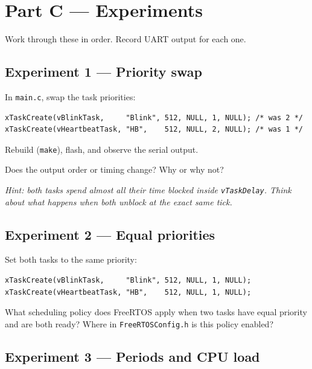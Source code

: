 \documentclass[11pt, a4paper]{article}
\newcommand{\file}[1]{\texttt{\small #1}}
\newcommand{\api}[1]{\texttt{\small #1}}
\begin{document}
\section{Part C --- Experiments}

Work through these in order.  Record UART output for each one.

\subsection{Experiment 1 --- Priority swap}

In \file{main.c}, swap the task priorities:

\begin{lstlisting}[style=cstyle]
xTaskCreate(vBlinkTask,     "Blink", 512, NULL, 1, NULL); /* was 2 */
xTaskCreate(vHeartbeatTask, "HB",    512, NULL, 2, NULL); /* was 1 */
\end{lstlisting}

Rebuild (\texttt{make}), flash, and observe the serial output.

\begin{questionbox}
  Does the output order or timing change?  Why or why not?

  \textit{Hint: both tasks spend almost all their time blocked inside
  \api{vTaskDelay}.  Think about what happens when both unblock at the exact same tick.}
\end{questionbox}

\subsection{Experiment 2 --- Equal priorities}

Set both tasks to the same priority:

\begin{lstlisting}[style=cstyle]
xTaskCreate(vBlinkTask,     "Blink", 512, NULL, 1, NULL);
xTaskCreate(vHeartbeatTask, "HB",    512, NULL, 1, NULL);
\end{lstlisting}

\begin{questionbox}
  What scheduling policy does FreeRTOS apply when two tasks have equal priority and are
  both ready?  Where in \file{FreeRTOSConfig.h} is this policy enabled?
\end{questionbox}

\subsection{Experiment 3 --- Periods and CPU load}
\end{document}
